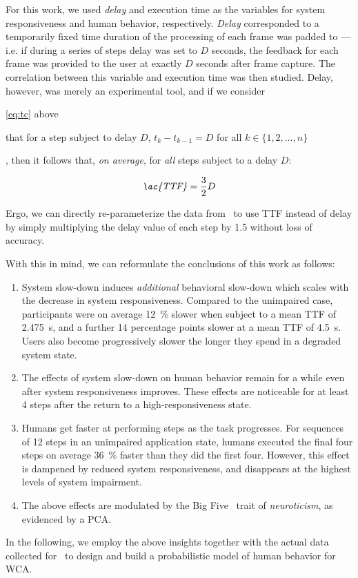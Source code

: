 For this work, we used \emph{delay} and execution time as the variables for system responsiveness and human behavior, respectively.
\emph{Delay} corresponded to a temporarily fixed time duration of the processing of each frame was padded to --- i.e. if during a series of steps delay was set to \( D \) seconds, the feedback for each frame was provided to the user at exactly \( D \) seconds after frame capture.
The correlation between this variable and execution time was then studied.
Delay, however, was merely an experimental tool, and if we consider
\begin{enumerate*}[itemjoin={{; }}, itemjoin={{; and }}]
    \item \cref{eq:tc} above
    \item that for a step subject to delay \( D \), \( t_k - t_{k - 1} = D \) for all \( k \in \{1, 2, \ldots, n\} \)
\end{enumerate*},
then it follows that, \emph{on average}, for \emph{all} steps subject to a delay \( D \):

\begin{align}\label{eq:ttf}
    \text{\emph{\ac{TTF}}} = \frac{3}{2}D
\end{align}

Ergo, we can directly re-parameterize the data from~\cite{olguinmunoz:impact2021} to use \ac{TTF} instead of delay by simply multiplying the delay value of each step by \num{1.5} without loss of accuracy.

With this in mind, we can reformulate the conclusions of this work as follows:
\begin{enumerate}
    \item System slow-down induces \emph{additional} behavioral slow-down which scales with the decrease in system responsiveness.
    Compared to the unimpaired case, participants were on average \SI{12}{\percent} slower when subject to a mean \ac{TTF} of \SI{2.475}{\second}, and a further \num{14} percentage points slower at a mean \ac{TTF} of \SI{4.5}{\second}.
    Users also become progressively slower the longer they spend in a degraded system state.

    \item\label{item:remain} The effects of system slow-down on human behavior remain for a while even after system responsiveness improves.
    These effects are noticeable for at least \num{4} steps after the return to a high-responsiveness state. 
    
    \item\label{item:speedup} Humans get faster at performing steps as the task progresses.
    For sequences of \num{12} steps in an unimpaired application state, humans executed the final four steps on average \SI{36}{\percent} faster than they did the first four.
    However, this effect is dampened by reduced system responsiveness, and disappears at the highest levels of system impairment.
    
    \item The above effects are modulated by the Big Five~\cite{oliver:bfi1999} trait of \emph{neuroticism}, as evidenced by a \ac{PCA}.
\end{enumerate}

In the following, we employ the above insights together with the actual data collected for~\cite{olguinmunoz:impact2021} to design and build a probabilistic model of human behavior for \ac{WCA}.
